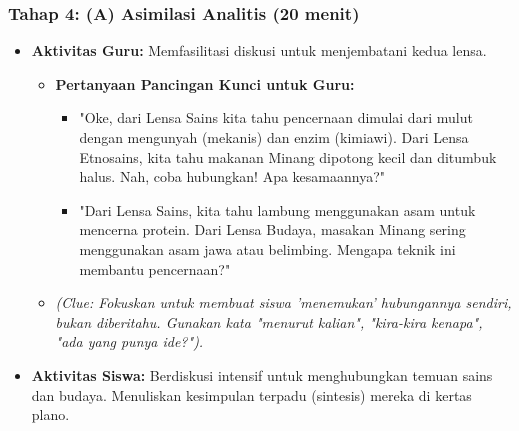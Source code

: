 \documentclass[a4paper,12pt]{article}
\begin{document}
\subsubsection{Tahap 4: (A) Asimilasi Analitis (20 menit)}
\begin{itemize}
\item \textbf{Aktivitas Guru:} Memfasilitasi diskusi untuk menjembatani kedua lensa.
    \begin{itemize}
    \item \textbf{Pertanyaan Pancingan Kunci untuk Guru:}
        \begin{itemize}
        \item "Oke, dari Lensa Sains kita tahu pencernaan dimulai dari mulut dengan mengunyah (mekanis) dan enzim (kimiawi). Dari Lensa Etnosains, kita tahu makanan Minang dipotong kecil dan ditumbuk halus. Nah, coba hubungkan! Apa kesamaannya?"
        \item "Dari Lensa Sains, kita tahu lambung menggunakan asam untuk mencerna protein. Dari Lensa Budaya, masakan Minang sering menggunakan asam jawa atau belimbing. Mengapa teknik ini membantu pencernaan?"
        \end{itemize}
    \item \textit{(Clue: Fokuskan untuk membuat siswa 'menemukan' hubungannya sendiri, bukan diberitahu. Gunakan kata "menurut kalian", "kira-kira kenapa", "ada yang punya ide?").}
    \end{itemize}
\item \textbf{Aktivitas Siswa:} Berdiskusi intensif untuk menghubungkan temuan sains dan budaya. Menuliskan kesimpulan terpadu (sintesis) mereka di kertas plano.
\end{itemize}
\end{document}
